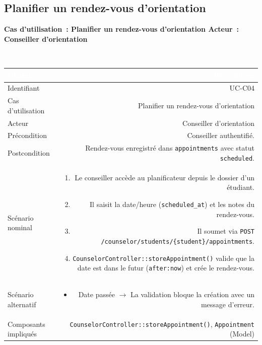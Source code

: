 \documentclass[a4paper,12pt]{article}
\newcommand{\ucheader}[2]{%
  \noindent\colorbox{capblue}{\parbox{\dimexpr\linewidth-2\fboxsep}{%
    \color{white}\bfseries\large Cas d'utilisation~: #1 \hfill \normalsize Acteur~: #2
  }}\\[2pt]
}
\begin{document}
\vspace{1em}

\subsection{Planifier un rendez-vous d'orientation}
\ucheader{Planifier un rendez-vous d'orientation}{Conseiller d'orientation}

\noindent
\begin{tabular}{|L|R|}
\hline
{}\textcolor{white}{\textbf{Champ}} & \textcolor{white}{\textbf{Description}} \\
\hline
{}Identifiant & UC-C04 \\
\hline
Cas d'utilisation & Planifier un rendez-vous d'orientation \\
\hline
{}Acteur & Conseiller d'orientation \\
\hline
Précondition & Conseiller authentifié. \\
\hline
{}Postcondition & Rendez-vous enregistré dans \texttt{appointments} avec statut \texttt{scheduled}. \\
\hline
Scénario nominal &
\begin{enumerate}
  \item Le conseiller accède au planificateur depuis le dossier d'un étudiant.
  \item Il saisit la date/heure (\texttt{scheduled\_at}) et les notes du rendez-vous.
  \item Il soumet via \texttt{POST /counselor/students/\{student\}/appointments}.
  \item \texttt{CounselorController::storeAppointment()} valide que la date est dans le futur (\texttt{after:now}) et crée le rendez-vous.
\end{enumerate} \\
\hline
{}Scénario alternatif &
\begin{itemize}
  \item Date passée $\rightarrow$ La validation bloque la création avec un message d'erreur.
\end{itemize} \\
\hline
Composants impliqués & \texttt{CounselorController::storeAppointment()}, \texttt{Appointment} (Model) \\
\hline
\end{tabular}
\end{document}
